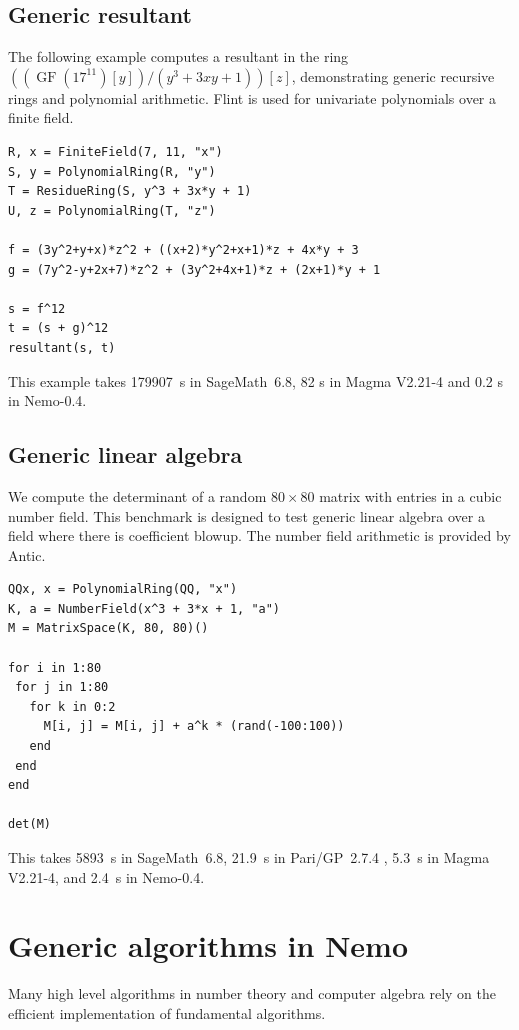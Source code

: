 \documentclass{sig-alternate-05-2015}
\begin{document}
\subsection{Generic resultant}

The following example computes a resultant
in the ring $((\operatorname{GF}(17^{11})[y])/(y^3 + 3xy + 1))[z]$,
demonstrating generic recursive rings and polynomial
arithmetic. Flint is used for univariate polynomials over a finite field.

\begin{verbatim}
R, x = FiniteField(7, 11, "x")
S, y = PolynomialRing(R, "y")
T = ResidueRing(S, y^3 + 3x*y + 1)
U, z = PolynomialRing(T, "z")

f = (3y^2+y+x)*z^2 + ((x+2)*y^2+x+1)*z + 4x*y + 3
g = (7y^2-y+2x+7)*z^2 + (3y^2+4x+1)*z + (2x+1)*y + 1

s = f^12
t = (s + g)^12
resultant(s, t)
\end{verbatim}

This example takes 179907~s in SageMath~6.8, 82 s in Magma V2.21-4
and 0.2 s in Nemo-0.4.

\subsection{Generic linear algebra}

We compute the determinant of a random $80\times80$ matrix
with entries in a cubic number field.
This benchmark is designed to test generic linear algebra over a field
where there is coefficient blowup. The number field arithmetic is
provided by Antic.

\begin{verbatim}
QQx, x = PolynomialRing(QQ, "x")
K, a = NumberField(x^3 + 3*x + 1, "a")
M = MatrixSpace(K, 80, 80)()

for i in 1:80
 for j in 1:80
   for k in 0:2
     M[i, j] = M[i, j] + a^k * (rand(-100:100))
   end
 end
end

det(M)
\end{verbatim}

This takes 5893~s in SageMath~6.8, 21.9~s in Pari/GP~2.7.4 \cite{pari}, 5.3~s in Magma V2.21-4,
and 2.4~s in Nemo-0.4.

\section{Generic algorithms in Nemo}

Many high level algorithms in number theory and computer algebra rely on
the efficient implementation of fundamental algorithms.
\end{document}
